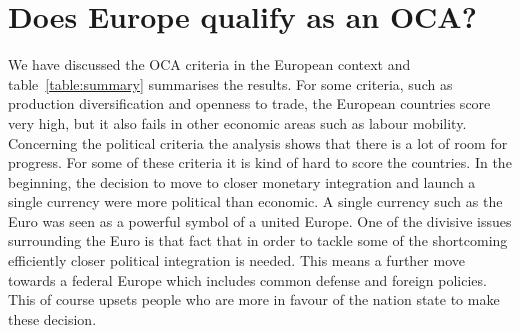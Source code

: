 \documentclass{tufte-handout}
\begin{document}
\section{Does Europe qualify as an OCA?}
We have discussed the OCA criteria in the European context and table~\ref{table:summary} summarises the results. 
For some criteria, such as production diversification and openness to trade, the European countries score very high, but it also fails in other economic areas such as labour mobility. 
Concerning the political criteria the analysis shows that there is a lot of room for progress. 
For some of these criteria it is kind of hard to score the countries. 
In the beginning, the decision to move to closer monetary integration and launch a single currency were more political than economic. 
A single currency such as the Euro was seen as a powerful symbol of a united Europe. 
One of the divisive issues surrounding the Euro is that fact that in order to tackle some of the shortcoming efficiently closer political integration is needed. 
This means a further move towards a federal Europe which includes common defense and foreign policies. 
This of course upsets people who are more in favour of the nation state to make these decision.
\begin{table}[!h] \centering \caption{Scorecard for the OCA criteria} \label{table:summary}
\end{table}
\end{document}
